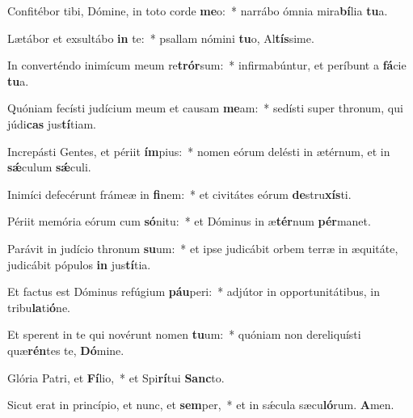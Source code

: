 \item Confitébor tibi, Dómine, in toto corde \textbf{me}o:~* narrábo ómnia mira\textbf{bí}lia \textbf{tu}a.
\item Lætábor et exsultábo \textbf{in} te:~* psallam nómini \textbf{tu}o, Al\textbf{tís}sime.
\item In converténdo inimícum meum re\textbf{trór}sum:~* infirmabúntur, et períbunt a \textbf{fá}cie \textbf{tu}a.
\item Quóniam fecísti judícium meum et causam \textbf{me}am:~* sedísti super thronum, qui júdi\textbf{cas} jus\textbf{tí}tiam.
\item Increpásti Gentes, et périit \textbf{ím}pius:~* nomen eórum delésti in ætérnum, et in \textbf{sǽ}culum \textbf{sǽ}culi.
\item Inimíci defecérunt frámeæ in \textbf{fi}nem:~* et civitátes eórum \textbf{de}stru\textbf{xís}ti.
\item Périit memória eórum cum \textbf{só}nitu:~* et Dóminus in æ\textbf{tér}num \textbf{pér}manet.
\item Parávit in judício thronum \textbf{su}um:~* et ipse judicábit orbem terræ in æquitáte, judicábit pópulos \textbf{in} jus\textbf{tí}tia.
\item Et factus est Dóminus refúgium \textbf{páu}peri:~* adjútor in opportunitátibus, in tribu\textbf{la}ti\textbf{ó}ne.
\item Et sperent in te qui novérunt nomen \textbf{tu}um:~* quóniam non dereliquísti quæ\textbf{rén}tes te, \textbf{Dó}mine.
\item Glória Patri, et \textbf{Fí}lio,~* et Spi\textbf{rí}tui \textbf{Sanc}to.
\item Sicut erat in princípio, et nunc, et \textbf{sem}per,~* et in sǽcula sæcu\textbf{ló}rum. \textbf{A}men.
